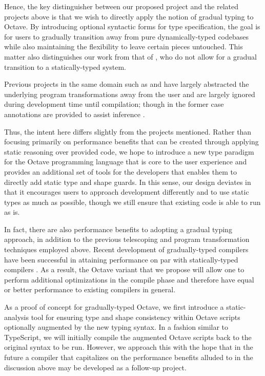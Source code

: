 Hence, the key distinguisher between our proposed project and the related projects above is that we wish to directly apply the notion of gradual typing to Octave. By introducing optional syntactic forms for type specification, the goal is for users to gradually transition away from pure dynamically-typed codebases while also maintaining the flexibility to leave certain pieces untouched. This matter also distinguishes our work from that of \citet{hendren2011typing}, who do not allow for a gradual transition to a statically-typed system.

Previous projects in the same domain such as \citet{chauhan2003type} and \citet{olmos2003turning} have largely abstracted the underlying program transformations away from the user and are largely ignored during development time until compilation; though in the former case annotations are provided to assist inference \cite{chauhan2003type}.

Thus, the intent here differs slightly from the projects mentioned. Rather than focusing primarily on performance benefits that can be created through applying static reasoning over provided code, we hope to introduce a new type paradigm for the Octave programming language that is core to the user experience and provides an additional set of tools for the developers that enables them to directly add static type and shape guards. In this sense, our design deviates in that it encourages users to approach development differently and to use static types as much as possible, though we still ensure that existing code is able to run as is.

In fact, there are also performance benefits to adopting a gradual typing approach, in addition to the previous telescoping and program transformation techniques employed above. Recent development of gradually-typed compilers have been successful in attaining performance on par with statically-typed compilers \cite{kuhlenschmidt2018efficient}. As a result, the Octave variant that we propose will allow one to perform additional optimizations in the compile phase and therefore have equal or better performance to existing compilers in general.

As a proof of concept for gradually-typed Octave, we first introduce a static-analysis tool for ensuring type and shape consistency within Octave scripts optionally augmented by the new typing syntax. In a fashion similar to TypeScript, we will initially compile the augmented Octave scripts back to the original syntax to be run. However, we approach this with the hope that in the future a compiler that capitalizes on the performance benefits alluded to in the discussion above may be developed as a follow-up project.

